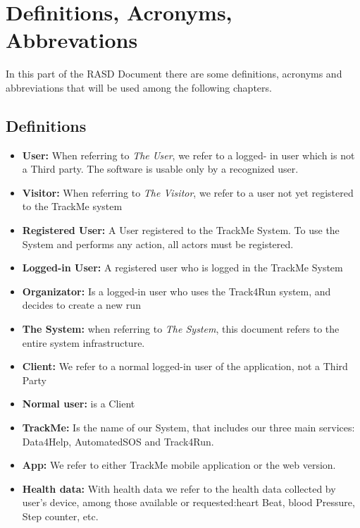 \section{Definitions, Acronyms, Abbrevations}
In this part of the RASD Document there are some definitions, acronyms and abbreviations that will be used among the following chapters.
\subsection{Definitions}
\begin{itemize}

\item \textbf{User:} When referring to \emph{The User}, we refer to a logged- in user which is not a Third party. The software is usable only by a recognized user. 

\item \textbf{Visitor:} When referring to \emph{The Visitor}, we refer to a user not yet registered to the TrackMe system

\item \textbf{Registered User:} A User registered to the TrackMe System. To use the System and performs any action, all actors must be registered. 

\item\textbf{Logged-in User:} A registered user who is logged in the TrackMe System

\item\textbf{Organizator:} Is a logged-in  user who uses the Track4Run system, and decides to create a new run
\item \textbf{The System:} when referring to \emph{The System}, this document refers to the entire system infrastructure.

\item \textbf{Client:} We refer to a normal logged-in user of the application, not a Third Party
\item\textbf{Normal user: } is a Client

\item\textbf{TrackMe:}
Is the name of our System, that  includes our three main services: Data4Help, AutomatedSOS and Track4Run.
\item\textbf{App:} We refer to either TrackMe mobile application or the web version.

\item\textbf{Health data:} With health data we refer to the health data collected by user's device, among those available or requested:heart Beat, blood Pressure, Step counter, etc.


\end{itemize}
